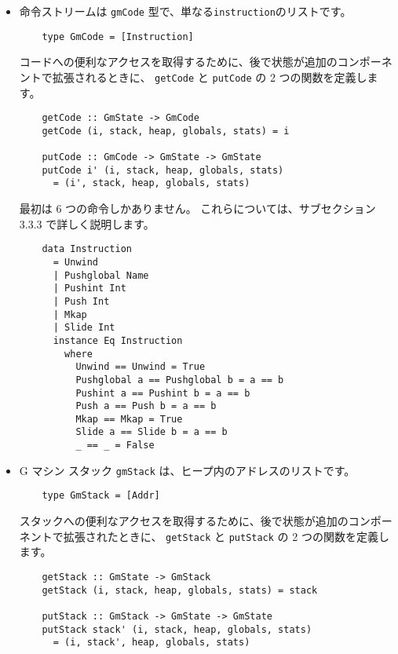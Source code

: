\documentclass{jarticle}
\begin{document}
\begin{itemize}
	\item 命令ストリームは \texttt{gmCode} 型で、単なる\texttt{instruction}のリストです。

	      \begin{verbatim}
    type GmCode = [Instruction]
  \end{verbatim}

	      コードへの便利なアクセスを取得するために、後で状態が追加のコンポーネントで拡張されるときに、
	      \texttt{getCode} と \texttt{putCode} の 2 つの関数を定義します。


	      \begin{verbatim}
    getCode :: GmState -> GmCode
    getCode (i, stack, heap, globals, stats) = i
  
    putCode :: GmCode -> GmState -> GmState
    putCode i' (i, stack, heap, globals, stats)
      = (i', stack, heap, globals, stats)
  \end{verbatim}

	      最初は 6 つの命令しかありません。
	      これらについては、サブセクション 3.3.3 で詳しく説明します。

	      \begin{verbatim}
    data Instruction
      = Unwind
      | Pushglobal Name
      | Pushint Int
      | Push Int
      | Mkap
      | Slide Int
      instance Eq Instruction
        where
          Unwind == Unwind = True
          Pushglobal a == Pushglobal b = a == b
          Pushint a == Pushint b = a == b
          Push a == Push b = a == b
          Mkap == Mkap = True
          Slide a == Slide b = a == b
          _ == _ = False
  \end{verbatim}

	\item G マシン スタック \texttt{gmStack} は、ヒープ内のアドレスのリストです。

	      \begin{verbatim}
    type GmStack = [Addr]
  \end{verbatim}

	      スタックへの便利なアクセスを取得するために、後で状態が追加のコンポーネントで拡張されたときに、
	      \texttt{getStack} と \texttt{putStack} の 2 つの関数を定義します。

	      \begin{verbatim}
    getStack :: GmState -> GmStack
    getStack (i, stack, heap, globals, stats) = stack

    putStack :: GmStack -> GmState -> GmState
    putStack stack' (i, stack, heap, globals, stats)
      = (i, stack', heap, globals, stats)
  \end{verbatim}


\end{itemize}
\end{document}
